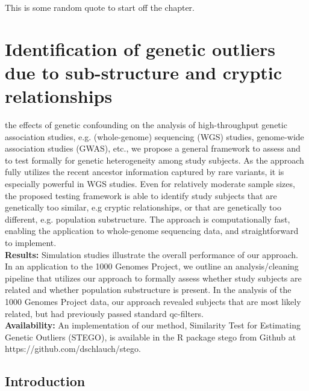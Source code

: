 \begin{savequote}[75mm]
This is some random quote to start off the chapter.
\end{savequote}

\chapter{Identification of genetic outliers due to sub-structure and cryptic relationships}

 the effects of genetic confounding on the analysis of high-throughput genetic association studies, e.g. (whole-genome) sequencing (WGS) studies, genome-wide association studies (GWAS), etc., we propose a general framework to assess and to test formally for genetic heterogeneity among study subjects. As the approach fully utilizes the recent ancestor information captured by rare variants, it is especially powerful in WGS studies. Even for relatively moderate sample sizes, the proposed testing framework is able to identify study subjects that are genetically too similar, e.g cryptic relationships, or that are genetically too different, e.g. population substructure. The approach is computationally fast, enabling the application to whole-genome sequencing data, and straightforward to implement.\\
 \textbf{Results:} Simulation studies illustrate the overall performance of our approach. In an application to the 1000 Genomes Project, we outline an analysis/cleaning pipeline that utilizes our approach to formally assess whether study subjects are related and whether population substructure is present. In the analysis of the 1000 Genomes Project data, our approach revealed subjects that are most likely related, but had previously passed standard qc-filters. \\
\textbf{Availability:} An implementation of our method, Similarity Test for Estimating Genetic Outliers (STEGO), is available in the R package stego from Github at https://github.com/dschlauch/stego.


\section{Introduction}

